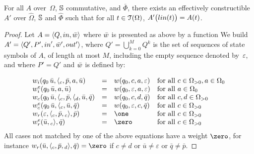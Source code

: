 \begin{proposition}\label{lem:SWTA}
For all \SWTA $A$ over~$\Omega$, $\mathbb{S}$ commutative, and $\bar\Phi$,
there exists an effectively constructible \SWVPA $A'$ over
$\hat\Omega$, $\mathbb{S}$ and $\hat\Phi$
such that for all $t \in \mathcal{T}(\Omega)$, $A'\bigl(\lin(t)\bigr) = A(t)$.
\end{proposition}
%
\begin{proof}
Let $A = \< Q, \init, \bar{\wei} >$ where $\bar{\wei}$ is presented as above by a function
We build
$A' = \< Q', P', \init', \bar{\wei}', \final' >$,
where $Q' = \bigcup_{k=0}^{M} Q^k$ is the set of sequences of state symbols of $A$,
of length at most $M$, including the empty sequence denoted by~$\varepsilon$,
and where $P' = Q'$ and $\bar\wei$ is defined by:

\[
\begin{array}{lcll}
\weii(q_0\, \bar{u}, {\call{c}}, \bar{p}, a, \bar{u}) & = & \wei(q_0, c, a, \varepsilon) &
\mathrm{for~all~} c \in \Omega_{>0}, a \in \Omega_0\\ %
%
\weiei(q_0\,\bar{u}, a, \bar{u}) & = & \wei(q_0, \varepsilon, a, \varepsilon) &
\mathrm{for~all~} a \in \Omega_0\\
%
\weic(q_0\,\bar{u}, {\call{c}}, \bar{p}, \call{d}, \bar{u}, \bar{q}) & = & \wei(q_0, c, d, \bar{q}) &
\mathrm{for~all~} c, d \in \Omega_{>0}\\ %
%
\weiec(q_0\,\bar{u}, \call{c}, \bar{u}, \bar{q}) & = & \wei(q_0, \varepsilon, c, \bar{q}) &
\mathrm{for~all~} c \in \Omega_{>0}\\
%
\weir(\varepsilon, {\call{c}}, \bar{p}, {\return{c}}, \bar{p}) & = & \one &
\mathrm{for~all~}  c \in \Omega_{>0}\\ %
%
\weier(\bar{u}, {\return{c}}, \bar{q}) & = & \zero &
\mathrm{for~all~}  c \in \Omega_{>0}
\end{array}
\]
\noindent
All cases not matched by one of the above equations have a weight $\zero$,
for instance  %
$\weir(\bar{u}, {\call{c}}, \bar{p}, {\return{d}}, \bar{q}) = \zero$
if $c \neq d$
or $\bar{u} \neq \varepsilon$
or $\bar{q} \neq \bar{p}$.
%
\end{proof}




\newpage
\listoftodos



